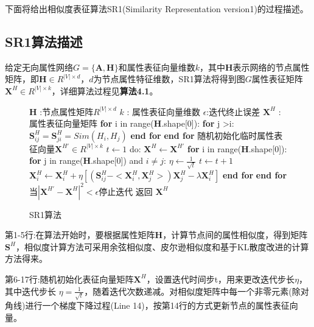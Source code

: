下面将给出相似度表征算法SR1(Similarity Representation version1)的过程描述。
\subsection{SR1算法描述}
给定无向属性网络$G=\{\textbf{A}, \textbf{H}\}$和属性表征向量维数$k$，其中$\textbf{H}$表示网络的节点属性矩阵，即$\textbf{H}\in R^{|V|\times d}$，$d$为节点属性特征维数，SR1算法将得到图$G$属性表征矩阵$\textbf{X}^H\in R^{|V|\times k}$，详细算法过程见\textbf{算法4.1}。
\begin{figure}[htb]
	\centering
	\begin{minipage}{.7\linewidth}
		\begin{algorithm}[H]
			\small
			\caption{SR1算法}
			\begin{algorithmic}[1]
				\Require
				\Statex $\textbf{H}$ :节点属性矩阵$R^{|V|\times d}$
				\Statex $k$ : 属性表征向量维数
				\Statex $\epsilon$:迭代终止误差
				\Ensure
				\Statex $\textbf{X}^H$ :属性表征向量矩阵
				\Statex
				\State \textbf{for} i in range(\textbf{H}.shape[0]):
				\State \quad \textbf{for} j >i:
				\State\qquad	$\textbf{S}^H_{ij}=\textbf{S}^H_{ji} = Sim(H_i, H_j)$
				\State \quad \textbf{end for}
				\State \textbf{end for}
				\State 随机初始化临时属性表征向量$\textbf{X}^{H\prime}\in R^{|V|\times k}$
				\State $t \leftarrow 1$
				\State do:
				\State \quad $\textbf{X}^H\leftarrow\textbf{X}^{H\prime}$
				\State\quad \textbf{for} i in range(\textbf{H}.shape[0]):
				\State\qquad \textbf{for} j in range(\textbf{H}.shape[0]) and $i\ne j$:
				\State\quad \qquad $\eta \leftarrow \frac{1}{\sqrt{t}}$
				\State\quad \qquad $t\leftarrow t+1$
				\State\quad \qquad $\textbf{X}^H_i \leftarrow \textbf{X}^H_i + \eta [(\textbf{S}^H_{ij}-<\textbf{X}^H_i, \textbf{X}^H_j>)\textbf{X}^H_j - \lambda \textbf{X}^H_i]$
				\State \qquad \textbf{end for}
				\State \quad \textbf{end for}
				\State 当$|\textbf{X}^{H\prime}-\textbf{X}^H|^2<\epsilon$停止迭代
				\State 返回 $\textbf{X}^H$
			\end{algorithmic}
		\end{algorithm}
	\end{minipage}
\end{figure}

第1-5行:在算法开始时，要根据属性矩阵$\textbf{H}$，计算节点间的属性相似度，得到矩阵$\textbf{S}^H$，相似度计算方法可采用余弦相似度、皮尔逊相似度和基于KL散度改进的计算方法得来。

第6-17行:随机初始化表征向量矩阵$\textbf{X}^H$，设置迭代时间步t，用来更改迭代步长$\eta$，其中迭代步长 $\eta = \frac{1}{\sqrt{t}}$，随着迭代次数递减。对相似度矩阵中每一个非零元素(除对角线)进行一个梯度下降过程(Line 14)，按第14行的方式更新节点的属性表征向量。

